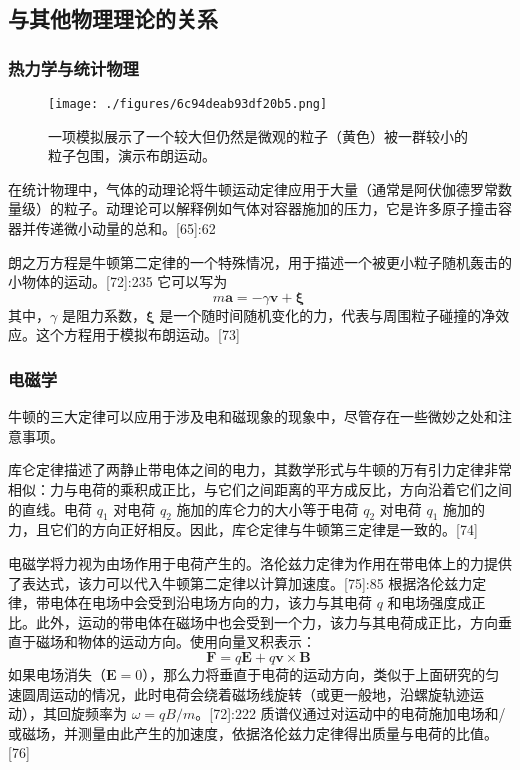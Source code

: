 \subsection{与其他物理理论的关系}
\subsubsection{热力学与统计物理}
\begin{figure}[ht]
\centering
\texttt{[image: ./figures/6c94deab93df20b5.png]}
\caption{一项模拟展示了一个较大但仍然是微观的粒子（黄色）被一群较小的粒子包围，演示布朗运动。} \label{fig_NEW01_12}
\end{figure}
在统计物理中，气体的动理论将牛顿运动定律应用于大量（通常是阿伏伽德罗常数量级）的粒子。动理论可以解释例如气体对容器施加的压力，它是许多原子撞击容器并传递微小动量的总和。[65]:62

朗之万方程是牛顿第二定律的一个特殊情况，用于描述一个被更小粒子随机轰击的小物体的运动。[72]:235 它可以写为
\[
m\mathbf {a} = -\gamma \mathbf {v} + \mathbf {\xi }~
\]
其中，\( \gamma \) 是阻力系数，\( \mathbf {\xi } \) 是一个随时间随机变化的力，代表与周围粒子碰撞的净效应。这个方程用于模拟布朗运动。[73]
\subsubsection{电磁学}
牛顿的三大定律可以应用于涉及电和磁现象的现象中，尽管存在一些微妙之处和注意事项。

库仑定律描述了两静止带电体之间的电力，其数学形式与牛顿的万有引力定律非常相似：力与电荷的乘积成正比，与它们之间距离的平方成反比，方向沿着它们之间的直线。电荷 \( q_1 \) 对电荷 \( q_2 \) 施加的库仑力的大小等于电荷 \( q_2 \) 对电荷 \( q_1 \) 施加的力，且它们的方向正好相反。因此，库仑定律与牛顿第三定律是一致的。[74]

电磁学将力视为由场作用于电荷产生的。洛伦兹力定律为作用在带电体上的力提供了表达式，该力可以代入牛顿第二定律以计算加速度。[75]:85 根据洛伦兹力定律，带电体在电场中会受到沿电场方向的力，该力与其电荷 \( q \) 和电场强度成正比。此外，运动的带电体在磁场中也会受到一个力，该力与其电荷成正比，方向垂直于磁场和物体的运动方向。使用向量叉积表示：
\[
\mathbf{F} = q\mathbf{E} + q\mathbf{v} \times \mathbf{B}~
\]
如果电场消失（\( \mathbf{E} = 0 \)），那么力将垂直于电荷的运动方向，类似于上面研究的匀速圆周运动的情况，此时电荷会绕着磁场线旋转（或更一般地，沿螺旋轨迹运动），其回旋频率为 \( \omega = qB/m \)。[72]:222 质谱仪通过对运动中的电荷施加电场和/或磁场，并测量由此产生的加速度，依据洛伦兹力定律得出质量与电荷的比值。[76]

